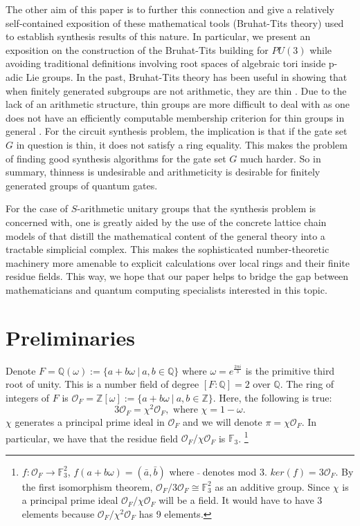 \documentclass{eptcs}
\theoremstyle{remark}
\theoremstyle{definition}
\begin{document}
The other aim of this paper is to further this connection and give a relatively self-contained exposition of these mathematical tools (Bruhat-Tits theory) used to establish synthesis results of this nature. In particular, we present an exposition on the construction of the Bruhat-Tits building for $PU(3)$ while avoiding traditional definitions involving root spaces of algebraic tori inside p-adic Lie groups. In the past, Bruhat-Tits theory has been useful in showing that when finitely generated subgroups are not arithmetic, they are thin \cite{evra2024arithmeticitycoveringrate9cyclotomic}. 
Due to the lack of an arithmetic structure, thin groups are more difficult to deal with as one does not have an efficiently computable membership criterion for thin groups in general \cite{sarnak2012notes}. For the circuit synthesis problem, the implication is that if the gate set $G$ in question is thin, it does not satisfy a ring equality. This makes the problem of finding good synthesis algorithms for the gate set $G$ much harder. So in summary, thinness is undesirable and arithmeticity is desirable for finitely generated groups of quantum gates.

For the case of $S$-arithmetic unitary groups that the synthesis problem is concerned with, one is greatly aided by the use of the concrete lattice chain models of \cite{abramenko2002lattice} that distill the mathematical content of the general theory into a tractable simplicial complex. This makes the sophisticated number-theoretic machinery more amenable to explicit calculations over local rings and their finite residue fields. This way, we hope that our paper helps to bridge the gap between mathematicians and quantum computing specialists interested in this topic.
\section{Preliminaries}
Denote  $F = \mathbb{Q}(\omega):=\{a+b\omega ~|~a,b\in \mathbb{Q}\}$ where $\omega=e^{\frac{2\pi i}{3}}$ is the primitive third root of unity.
This is a number field of degree $[F:\mathbb{Q}]=2$ over $\mathbb{Q}$. The ring of integers of $F$ is $\mathcal{O}_F = \mathbb{Z}[\omega]:=\{a+b\omega~|~a,b\in \mathbb{Z}\}$. 
Here, the following is true:
\begin{equation}
  3 \mathcal{O}_F = \chi^{2} \mathcal{O}_F,
  \text{ where }\chi = 1- \omega.
\end{equation}
$\chi$ generates a principal prime ideal in $\mathcal{O}_F$ and we will denote $\pi = \chi  \mathcal{O}_{F}$. In particular, we have that the residue field $\mathcal{O}_F/\chi \mathcal{O}_F$ is $\mathbb{F}_3$. \footnote{$f: \mathcal{O}_{F} \rightarrow \mathbb{F}_3^2$, $f(a+b\omega) = (\bar{a},\bar{b})$ where $\bar{}$ denotes mod 3. $ker(f) = 3\mathcal{O}_F$. By the first isomorphism theorem, $\mathcal{O}_F/3\mathcal{O}_F \cong \mathbb{F}_3^2$ as an additive group. Since $\chi$ is a principal prime ideal $\mathcal{O}_F/\chi \mathcal{O}_F$ will be a field. It would have to have 3 elements because $\mathcal{O}_F/\chi^2 \mathcal{O}_F$ has 9 elements.}
\end{document}
